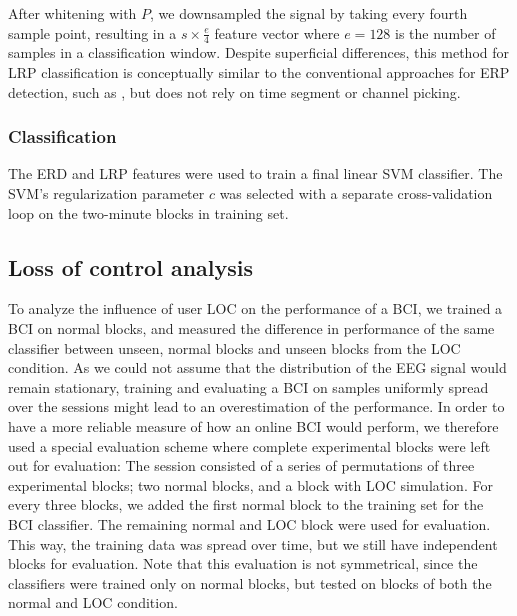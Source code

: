 After whitening with $P$, we downsampled the signal by taking every fourth
sample point, resulting in a $s \times \frac{e}{4}$ feature vector where
$e=128$ is the number of samples in a classification window.
%
Despite superficial differences, this method for \ac{LRP} classification is
conceptually similar to the conventional approaches for \ac{ERP} detection,
such as \cite{blankertz2003bbr, blankertz2011sta}, but does not rely on time
segment or channel picking.

\subsubsection{Classification}
The \ac{ERD} and \ac{LRP} features were used to train a final linear \ac{SVM}
classifier. The \ac{SVM}'s regularization parameter $c$ was selected with a
separate cross-validation loop on the two-minute blocks in training set. 

\subsection{Loss of control analysis} \label{sec:dga}
\begin{sloppypar}
To analyze the influence of user \ac{LOC} on the performance of a \ac{BCI},
we trained a \ac{BCI} on normal blocks, and measured the difference in
performance of the same classifier between unseen, normal blocks and unseen
blocks from the \ac{LOC} condition.
% 
As we could not assume that the distribution of the \ac{EEG} signal
would remain stationary, training and evaluating a \ac{BCI} on samples uniformly
spread over the sessions might lead to an overestimation of the performance.
In order to have a more reliable measure of how an online \ac{BCI} would
perform, we therefore used a special evaluation scheme where complete
experimental blocks were left out for evaluation:
%
The session consisted of a series of permutations of three experimental blocks;
two normal blocks, and a block with \ac{LOC} simulation. For every three
blocks, we added the first normal block to the training set for the \ac{BCI}
classifier. The remaining normal and \ac{LOC} block were used for evaluation.
This way, the training data was spread over time, but we still have independent
blocks for evaluation.
%
Note that this evaluation is not symmetrical, since the classifiers were
trained only on normal blocks, but tested on blocks of both the normal and
\ac{LOC} condition. 
\end{sloppypar}

